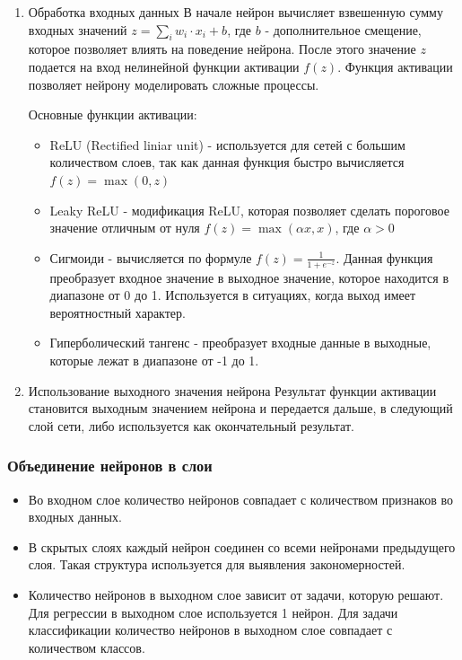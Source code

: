 {\begin{enumerate}
\item Обработка входных данных
В начале нейрон вычисляет взвешенную сумму входных значений \(z = \sum_{i} w_{i} \cdot x_{i} + b\),
где \(b\) - дополнительное смещение, которое позволяет влиять на поведение нейрона.
После этого значение \(z\) подается на вход нелинейной функции активации \(f(z)\). Функция активации
позволяет нейрону моделировать сложные процессы.

Основные функции активации:
\begin{itemize}
\item ReLU (Rectified liniar unit) - используется для сетей с большим количеством слоев, так как
данная функция быстро вычисляется \(f(z) = \max(0, z)\)
\item Leaky ReLU - модификация ReLU, которая позволяет сделать пороговое значение отличным от нуля
\(f(z) = \max(\alpha x,x)\), где \(\alpha>0\)
\item Сигмоиди - вычисляется по формуле \(f(z) = \frac{1}{1 + e^{-z}}\). Данная функция преобразует
входное значение в выходное значение, которое находится в диапазоне от 0 до 1. Используется в
ситуациях, когда выход имеет вероятностный характер.
\item Гиперболический тангенс - преобразует входные данные в выходные, которые лежат в диапазоне от
-1 до 1.
\end{itemize}

\item Использование выходного значения нейрона
Результат функции активации становится выходным значением нейрона и передается дальше, в
следующий слой сети, либо используется как окончательный результат.
\end{enumerate}
\subsubsection{Объединение нейронов в слои}

\begin{itemize}
\item Во входном слое количество нейронов совпадает с количеством признаков во входных данных.
\item В скрытых слоях каждый нейрон соединен со всеми нейронами предыдущего слоя. Такая структура
используется для выявления закономерностей.
\item Количество нейронов в выходном слое зависит от задачи, которую решают. Для регрессии в выходном
слое используется 1 нейрон. Для задачи классификации количество нейронов в выходном слое совпадает
с количеством классов.
\end{itemize}
}
